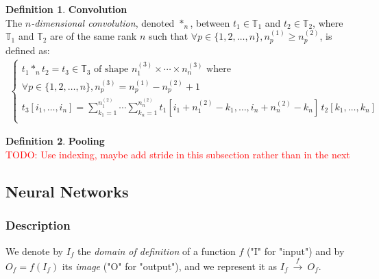 \documentclass{article}
\theoremstyle{definition}
\newtheorem{definition}{Definition}[section]
\theoremstyle{remark}
\theoremstyle{plain}
\newcommand{\tspace}{\mathbb{T}}
\newcommand{\todo}[1]{\textcolor{red}{TODO: #1\\}}
\begin{document}
\begin{definition}\textbf{Convolution}\\
The \emph{$n$-dimensional convolution}, denoted $\ast_n$, between $t_1 \in \tspace_1$ and $t_2 \in \tspace_2$, where $\tspace_1$ and $\tspace_2$ are of the same rank $n$ such that $\forall p \in \{1, 2, \ldots, n\}, n_p^{(1)} \ge n_p^{(2)}$, is defined as:
\begin{gather*}
\left\{
  \begin{array}{l}
    t_1 \ast_n t_2 = t_3 \in  \tspace_3 \text{ of shape } n_1^{(3)} \times \cdots \times n_n^{(3)}
    \text{ where} \\
    \forall p \in \{1, 2, \ldots, n\}, n_p^{(3)} = n_p^{(1)} - n_p^{(2)} + 1 \\
    t_3[i_1, \ldots, i_n] =
    \displaystyle \sum_{k_1=1}^{n_1^{(2)}} \cdots \sum_{k_n=1}^{n_n^{(2)}}
    t_1[i_1 + n_1^{(2)} - k_1, \ldots, i_n + n_n^{(2)} - k_n] \hspace{2pt} t_2[k_1, \ldots, k_n] \\
  \end{array}
\right.
\end{gather*}
\label{convdef}
\end{definition}

\begin{definition}\textbf{Pooling}\\

\todo{Use indexing, maybe add stride in this subsection rather than in the next}

\end{definition}

\subsection{Neural Networks}

\subsubsection{Description}

We denote by $I_f$ the \textit{domain of definition} of a function $f$ ("I" for "input") and by $O_f = f(I_f)$ its \textit{image} ("O" for "output"), and we represent it as $I_f~\xrightarrow{f}~O_f$.
\end{document}
